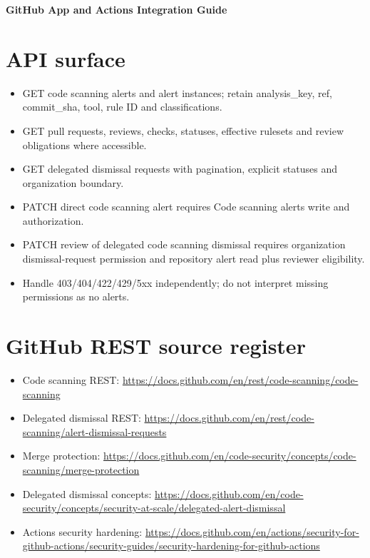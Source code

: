 \documentclass[11pt,letterpaper]{article}
\begin{document}
\begin{center}
{\LARGE\bfseries GitHub App and Actions Integration Guide}\par
\vspace{5pt}{\large Secure read-only observation and separately authorized executor}\par
\vspace{9pt}{\small Engineering reference | Proposed design | Not a deployment or approval record}\par
\end{center}
\tableofcontents
\clearpage
\section{API surface}
\begin{itemize}
\item GET code scanning alerts and alert instances; retain analysis\_key, ref, commit\_sha, tool, rule ID and classifications.
\item GET pull requests, reviews, checks, statuses, effective rulesets and review obligations where accessible.
\item GET delegated dismissal requests with pagination, explicit statuses and organization boundary.
\item PATCH direct code scanning alert requires Code scanning alerts write and authorization.
\item PATCH review of delegated code scanning dismissal requires organization dismissal-request permission and repository alert read plus reviewer eligibility.
\item Handle 403/404/422/429/5xx independently; do not interpret missing permissions as no alerts.
\end{itemize}

\section{GitHub REST source register}
\begin{itemize}
\item Code scanning REST: \url{https://docs.github.com/en/rest/code-scanning/code-scanning}
\item Delegated dismissal REST: \url{https://docs.github.com/en/rest/code-scanning/alert-dismissal-requests}
\item Merge protection: \url{https://docs.github.com/en/code-security/concepts/code-scanning/merge-protection}
\item Delegated dismissal concepts: \url{https://docs.github.com/en/code-security/concepts/security-at-scale/delegated-alert-dismissal}
\item Actions security hardening: \url{https://docs.github.com/en/actions/security-for-github-actions/security-guides/security-hardening-for-github-actions}
\end{itemize}
\end{document}
